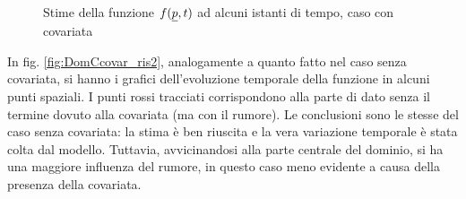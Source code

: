 \documentclass[a4paper,11pt,twoside,openright]{book}							%
\begin{document}
\begin{figure}[H]
{   }
\caption{Stime della funzione $f(\protect\underline{p},t)$ ad alcuni istanti di tempo, caso con covariata}
\label{fig:DomCcovar_ris}
\end{figure}
\newpage
In fig. \ref{fig:DomCcovar_ris2}, analogamente a quanto fatto nel caso senza covariata, si hanno i grafici dell'evoluzione temporale della funzione in alcuni punti spaziali. I punti rossi tracciati corrispondono alla parte di dato senza il termine dovuto alla covariata (ma con il rumore). Le conclusioni sono le stesse del caso senza covariata: la stima è ben riuscita e la vera variazione temporale è stata colta dal modello. Tuttavia, avvicinandosi alla parte centrale del dominio, si ha una maggiore influenza del rumore, in questo caso meno evidente a causa della presenza della covariata.
\end{document}
